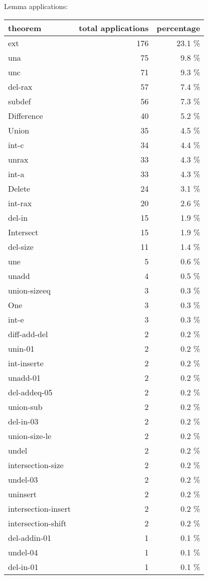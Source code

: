 \documentclass[a4paper]{article}
\begin{document}
Lemma applications:

\begin{supertabular}{l|r|r}
theorem	        & total applications & percentage \\ \hline
ext & 176 & 23.1 \% \\
una & 75 & 9.8 \% \\
unc & 71 & 9.3 \% \\
del-rax & 57 & 7.4 \% \\
subdef & 56 & 7.3 \% \\
Difference & 40 & 5.2 \% \\
Union & 35 & 4.5 \% \\
int-c & 34 & 4.4 \% \\
unrax & 33 & 4.3 \% \\
int-a & 33 & 4.3 \% \\
Delete & 24 & 3.1 \% \\
int-rax & 20 & 2.6 \% \\
del-in & 15 & 1.9 \% \\
Intersect & 15 & 1.9 \% \\
del-size & 11 & 1.4 \% \\
une & 5 & 0.6 \% \\
unadd & 4 & 0.5 \% \\
union-sizeeq & 3 & 0.3 \% \\
One & 3 & 0.3 \% \\
int-e & 3 & 0.3 \% \\
diff-add-del & 2 & 0.2 \% \\
unin-01 & 2 & 0.2 \% \\
int-inserte & 2 & 0.2 \% \\
unadd-01 & 2 & 0.2 \% \\
del-addeq-05 & 2 & 0.2 \% \\
union-sub & 2 & 0.2 \% \\
del-in-03 & 2 & 0.2 \% \\
union-size-le & 2 & 0.2 \% \\
undel & 2 & 0.2 \% \\
intersection-size & 2 & 0.2 \% \\
undel-03 & 2 & 0.2 \% \\
uninsert & 2 & 0.2 \% \\
intersection-insert & 2 & 0.2 \% \\
intersection-shift & 2 & 0.2 \% \\
del-addin-01 & 1 & 0.1 \% \\
undel-04 & 1 & 0.1 \% \\
del-in-01 & 1 & 0.1 \% \\

\end{supertabular}
\end{document}
